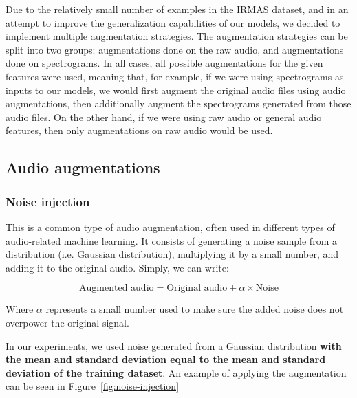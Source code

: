 Due to the relatively small number of examples in the IRMAS dataset, and in an attempt to improve the generalization capabilities of our models, we decided to implement multiple augmentation strategies. The augmentation strategies can be split into two groups: augmentations done on the raw audio, and augmentations done on spectrograms. In all cases, all possible augmentations for the given features were used, meaning that, for example, if we were using spectrograms as inputs to our models, we would first augment the original audio files using audio augmentations, then additionally augment the spectrograms generated from those audio files. On the other hand, if we were using raw audio or general audio features, then only augmentations on raw audio would be used. 


\subsection{Audio augmentations}

\subsubsection{Noise injection}

This is a common type of audio augmentation, often used in different types of audio-related machine learning. It consists of generating a noise sample from a distribution (i.e. Gaussian distribution), multiplying it by a small number, and adding it to the original audio. Simply, we can write:


\[ \text{{Augmented audio}} = \text{{Original audio}} + \alpha \times \text{{Noise}} \]

Where $\alpha$ represents a small number used to make sure the added noise does not overpower the original signal.

In our experiments, we used noise generated from a Gaussian distribution \textbf{with the mean and standard deviation equal to the mean and standard deviation of the training dataset}. An example of applying the augmentation can be seen in Figure~\ref{fig:noise-injection}

